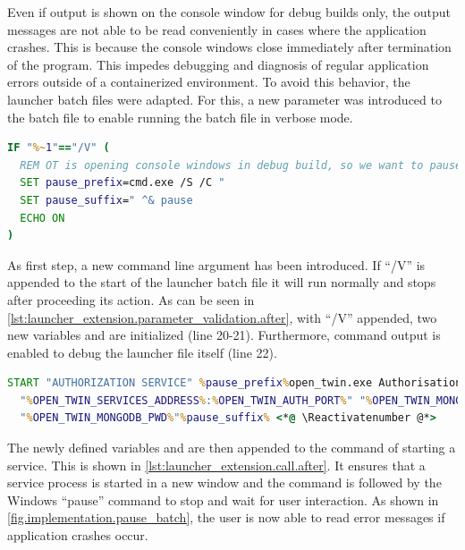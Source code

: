 Even if output is shown on the console window for debug builds only, the output messages are not able to be read conveniently in cases where the application crashes. This is because the console windows close immediately after termination of the program. This impedes debugging and diagnosis of regular application errors outside of a containerized environment.
To avoid this behavior, the launcher batch files were adapted. For this, a new parameter was introduced to the batch file to enable running the batch file in verbose mode.
\begin{lstlisting}[label=lst:launcher_extension.parameter_validation.after, caption={Additional command argument for preventing close of window after termination (\textit{/Microservices/Launcher/OpenTwin\_session.bat})}, language=cmd, firstnumber=18]
IF "%~1"=="/V" (
  REM OT is opening console windows in debug build, so we want to pause them at the end
  SET pause_prefix=cmd.exe /S /C "
  SET pause_suffix=" ^& pause
  ECHO ON
)
\end{lstlisting}
As first step, a new command line argument has been introduced. If \enquote{/V} is appended to the start of the launcher batch file it will run normally and stops after proceeding its action.  As can be seen in \autoref{lst:launcher_extension.parameter_validation.after}, with \enquote{/V} appended, two new variables  and  are initialized (line 20-21). Furthermore, command output is enabled to debug the launcher file itself (line 22).

\begin{lstlisting}[label=lst:launcher_extension.call.after, caption={Additional command extension for preventing close of window after termination (\textit{/Microservices/Launcher/OpenTwin\_session.bat})}, language=cmd, firstnumber=34]
START "AUTHORIZATION SERVICE" %pause_prefix%open_twin.exe AuthorisationService.dll <*@ \Suppressnumber @*>
  "%OPEN_TWIN_SERVICES_ADDRESS%:%OPEN_TWIN_AUTH_PORT%" "%OPEN_TWIN_MONGODB_ADDRESS%"
  "%OPEN_TWIN_MONGODB_PWD%"%pause_suffix% <*@ \Reactivatenumber @*>
\end{lstlisting}
The newly defined variables  and  are then appended to the command of starting a service. This is shown in \autoref{lst:launcher_extension.call.after}. It ensures that a service process is started in a new window and the command is followed by the \ac{Windows} \enquote{pause} command to stop and wait for user interaction. As shown in \autoref{fig.implementation.pause_batch}, the user is now able to read error messages if application crashes occur.

